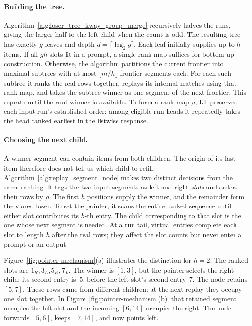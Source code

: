 

\paragraph{Building the tree.}
Algorithm~\ref{alg:loser_tree_kway_group_merge} recursively halves the runs, giving the larger half to the left child when the count is odd. The resulting tree has exactly $g$ leaves and depth $d=\lceil\log_2 g\rceil$. Each leaf initially supplies up to $h$ items. If all $gh$ slots fit in a prompt, a single rank map suffices for bottom-up construction. Otherwise, the algorithm partitions the current frontier into maximal subtrees with at most $\lfloor m/h\rfloor$ frontier segments each. For each such subtree it ranks the real rows together, replays its internal matches using that rank map, and takes the subtree winner as one segment of the next frontier. This repeats until the root winner is available. To form a rank map $\rho$, LT preserves each input run's established order: among eligible run heads it repeatedly takes the head ranked earliest in the listwise response.



\paragraph{Choosing the next child.}
A winner segment can contain items from both children. The origin of its last item therefore does not tell us which child to refill. Algorithm~\ref{alg:replay_segment_node} makes two distinct decisions from the same ranking. It tags the two input segments as left and right \emph{slots} and orders their rows by $\rho$. The first $h$ positions supply the winner, and the remainder form the stored loser. To set the pointer, it scans the entire ranked sequence until either slot contributes its $h$-th entry. The child corresponding to that slot is the one whose next segment is needed. At a run tail, virtual entries complete each slot to length $h$ after the real rows; they affect the slot counts but never enter a prompt or an output.




Figure~\ref{fig:pointer-mechanism}(a) illustrates the distinction for $h=2$. The ranked slots are $1_R,3_L,5_R,7_L$. The winner is $[1,3]$, but the pointer selects the right child: its second entry is~5, before the left slot's second entry~7. The node retains $[5,7]$. These rows came from different children; at the next replay they occupy one slot together. In Figure~\ref{fig:pointer-mechanism}(b), that retained segment occupies the left slot and the incoming $[6,14]$ occupies the right. The node forwards $[5,6]$, keeps $[7,14]$, and now points left.

